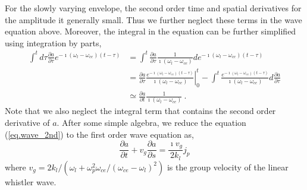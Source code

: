 For the slowly varying envelope, the second order time and spatial derivatives for the amplitude it generally small. Thus we further neglect these terms in the wave equation above.
Moreover, the integral in the equation can be further simplified using integration by parts, 
\begin{equation}
\begin{aligned}
\int^{t} d \tau \frac{\partial a}{\partial \tau} e^{-\imath\left(\omega_{l}-\omega_{c e}\right)(t-\tau)}
    &=\int^{t}\frac{\partial a}{\partial\tau} \frac{1}{\imath\left(\omega_l-\omega_{ce}\right)}d e^{-\imath\left(\omega_l-\omega_{ce}\right)\left(t-\tau\right)}
\\
    &=\left.\frac{\partial a}{\partial \tau}\frac{e^{-\imath\left(\omega_l-\omega_{ce}\right)\left(t-\tau\right)}}{\imath\left(\omega_l-\omega_{ce}\right)}\right|^{t}_{0} - \int^{t} \frac{e^{-\imath\left(\omega_l-\omega_{ce}\right)\left(t-\tau\right)}}{\imath\left(\omega_l-\omega_{ce}\right)}d \frac{\partial a}{\partial\tau}
    \\
    &\simeq \frac{\partial a}{\partial t}\frac{1}{\imath\left(\omega_{l}-\omega_{ce}\right)}~.
\end{aligned}
\end{equation}
Note that we also neglect the integral term that contains the second order derivative of $a$.
After some simple algebra, we reduce the equation (\ref{eq.wave_2nd}) to the first order wave equation as,
\begin{equation}\label{eq.wave_1st}
    \frac{\partial a}{\partial t} +v_g \frac{\partial a}{\partial s} =\frac{\imath v_g}{2 k_l} j_p
\end{equation}
where  $v_g = 2 k_l / (\omega_l + \omega_p^2 \omega_{ce}/(\omega_{ce}-\omega_l)^2) $  is the group velocity of the linear whistler wave.